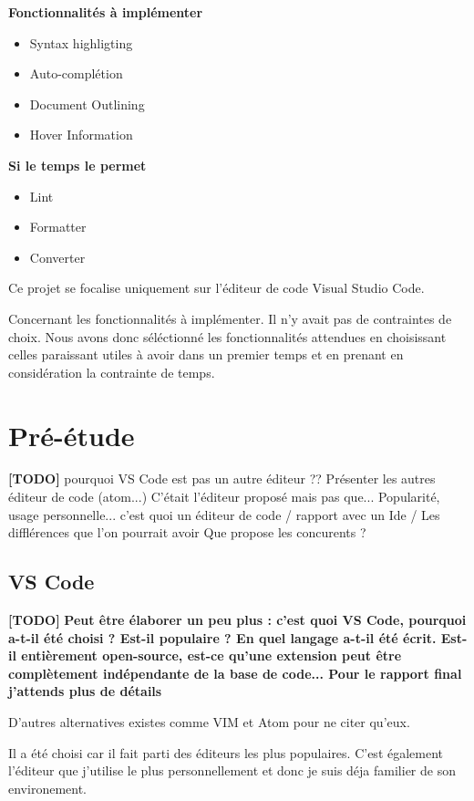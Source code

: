\documentclass[
    iict, %
    il, %
]{heig-tb}
\begin{document}
\textbf{Fonctionnalités à implémenter}
\begin{itemize}
    \item Syntax highligting
    \item Auto-complétion
    \item Document Outlining
    \item Hover Information
\end{itemize}

\textbf{Si le temps le permet}
\begin{itemize}
    \item Lint
    \item Formatter
    \item Converter
\end{itemize}

\vspace{\parskip}

Ce projet se focalise uniquement sur l'éditeur de code Visual Studio Code.

Concernant les fonctionnalités à implémenter. Il n'y avait pas de contraintes de choix.
Nous avons donc séléctionné les fonctionnalités attendues en choisissant celles paraissant utiles à avoir dans un premier temps et en prenant en considération la contrainte de temps.

\chapter{Pré-étude}

\textbf{[TODO]}
pourquoi VS Code est pas un autre éditeur ??
Présenter les autres éditeur de code (atom...)
C'était l'éditeur proposé mais pas que...
Popularité, usage personnelle...
c'est quoi un éditeur de code / rapport avec un Ide / Les difflérences que l'on pourrait avoir
Que propose les concurents ?

\section{VS Code}
\textbf{[TODO]}
\textbf{Peut être élaborer un peu plus : c'est quoi VS Code, pourquoi a-t-il été choisi ? Est-il populaire ? En quel langage a-t-il été écrit. Est-il entièrement open-source, est-ce qu'une extension peut être complètement indépendante de la base de code...
    Pour le rapport final j'attends plus de détails}

D'autres alternatives existes comme VIM et Atom pour ne citer qu'eux.

Il a été choisi car il fait parti des éditeurs les plus populaires. C'est également l'éditeur que j'utilise le plus personnellement et donc je suis déja familier de son environement.
\end{document}
